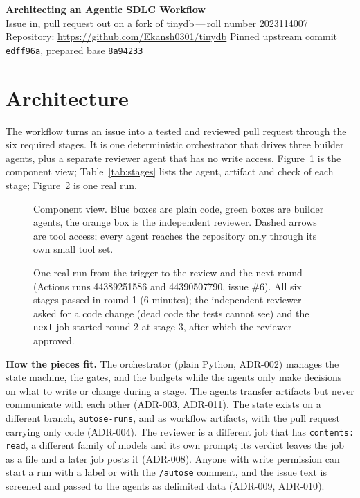 \documentclass[10pt,a4paper]{article}
\newcommand{\adr}[1]{\textsf{ADR-#1}}
\newcommand{\code}[1]{\texttt{\small #1}}
\begin{document}
\begin{center}
{\sffamily\bfseries\Large Architecting an Agentic SDLC Workflow}\\[2pt]
{\sffamily Issue in, pull request out on a fork of tinydb\,---\,roll number 2023114007}\\[1pt]
{\small Repository: \url{https://github.com/Ekansh0301/tinydb} \quad Pinned upstream commit \code{edff96a}, prepared base \code{8a94233}}
\end{center}

\section{Architecture}
The workflow turns an issue into a tested and reviewed pull request through the six required stages. It is one deterministic orchestrator that drives three builder agents, plus a separate reviewer agent that has no write access. Figure~\ref{fig:comp} is the component view; Table~\ref{tab:stages} lists the agent, artifact and check of each stage; Figure~\ref{fig:seq} is one real run.

\begin{figure}[ht]\centering
\resizebox{\linewidth}{!}{}
\caption{Component view. Blue boxes are plain code, green boxes are builder agents, the orange box is the independent reviewer. Dashed arrows are tool access; every agent reaches the repository only through its own small tool set.}\label{fig:comp}
\end{figure}



\begin{figure}[ht]\centering
\resizebox{\linewidth}{!}{}
\caption{One real run from the trigger to the review and the next round (Actions runs 44389251586 and 44390507790, issue \#6). All six stages passed in round 1 (6 minutes); the independent reviewer asked for a code change (dead code the tests cannot see) and the \code{next} job started round 2 at stage 3, after which the reviewer approved.}\label{fig:seq}
\end{figure}

\textbf{How the pieces fit.} The orchestrator (plain Python, \adr{002}) manages the state machine, the gates, and the budgets while the agents only make decisions on what to write or change during a stage. The agents transfer artifacts but never communicate with each other (\adr{003}, \adr{011}). The state exists on a different branch, \code{autose-runs}, and as workflow artifacts, with the pull request carrying only code (\adr{004}). The reviewer is a different job that has \code{contents: read}, a different family of models and its own prompt; its verdict leaves the job as a file and a later job posts it (\adr{008}). Anyone with write permission can start a run with a label or with the \code{/autose} comment, and the issue text is screened and passed to the agents as delimited data (\adr{009}, \adr{010}).
\end{document}
